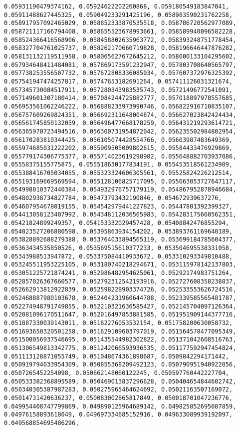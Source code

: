 \documentclass[11pt]{article}
\begin{document}
\begin{Verbatim}[commandchars=\\\{\}]
0.05931190479374162, 0.05924622202260868, 0.059180549183847041, 0.05911488627445325, 0.059049233291425196, 0.058983590231762258, 0.058917957092465029, 0.058852333870535518, 0.058786720562977089, 0.058721117166794408, 0.058655523678993661, 0.058589940096582228, 0.058524366416568906, 0.058458802635963772, 0.058393248751778454, 0.058327704761025737, 0.058262170660719828, 0.058196646447876282, 0.058131132119511958, 0.058065627672645212, 0.058000133104295602, 0.057934648411484081, 0.057869173591232947, 0.057803708640565797, 0.057738253556507732, 0.057672808336085034, 0.057607372976325392, 0.057541947474257817, 0.05747653182691264, 0.057411126031321674, 0.057345730084517911, 0.057280343983535743, 0.05721496772541091, 0.057149601307180414, 0.057084244725882777, 0.057018897978557685, 0.056953561062246222, 0.056888233973990746, 0.056822916710835107, 0.056757609269824351, 0.056692311648004874, 0.056627023842424434, 0.056561745850132059, 0.056496477668178259, 0.056431219293614721, 0.056365970723494516, 0.056300731954872042, 0.056235502984802954, 0.056170283810344425, 0.056105074428554766, 0.05603987483649369, 0.055974685031222202, 0.055909505009802615, 0.05584433476929869, 0.055779174306775377, 0.055714023619298982, 0.055648882703937086, 0.05558375155775875, 0.055518630177834191, 0.055453518561234989, 0.055388416705034055, 0.055323324606305561, 0.05525824226212514, 0.055193169669569594, 0.055128106825717095, 0.055063053727647117, 0.054998010372440384, 0.054932976757179119, 0.054867952878946684, 0.054802938734827784, 0.05473793432190846, 0.054672939637276, 0.054607954678019155, 0.054542979441227823, 0.05447801392399327, 0.054413058123407992, 0.054348112036565983, 0.054283175660562351, 0.05421824899249357, 0.054153332029457428, 0.05408842476855294, 0.054023527206880598, 0.05395863934154202, 0.053893761169640189, 0.053828892688279388, 0.053764033894565119, 0.053699184785604377, 0.05363434535850526, 0.053569515610377233, 0.053504695538331058, 0.05343988513947872, 0.053375084410933672, 0.053310293349810488, 0.053245511953225105, 0.053180740218294671, 0.053115978142137803, 0.053051225721874241, 0.052986482954625061, 0.05292174983751264, 0.052857026367660577, 0.052792312542193916, 0.052727608358238837, 0.052662913812922839, 0.052598228903374726, 0.052533553626724516, 0.052468887980103678, 0.052404231960644788, 0.052339585565481787, 0.052274948791749855, 0.052210321636585427, 0.052145704097126364, 0.052081096170511647, 0.052016497853881585, 0.051951909144377716, 0.051887330039143011, 0.05182276053532154, 0.051758200630058732, 0.051693650320501258, 0.051629109603797019, 0.051564578477095349, 0.051500056937546695, 0.051435544982302822, 0.051371042608516763, 0.051306549813342775, 0.051242066593936535, 0.051177592947454824, 0.051113128871055749, 0.051048674361898687, 0.0509842294171442, 0.050919794033954309, 0.050855368209492123, 0.050790951940922056, 0.0507265452254098, 0.050662148060122245, 0.050597760442227704, 0.050533382368895589, 0.050469013837296628, 0.050404654844602742, 0.050340305387987283, 0.050275965464624692, 0.05021163507169072, 0.05014731420636237, 0.050083002865817849, 0.050018701047236776, 0.049954408747799869, 0.049890125964689142, 0.049825852695087859, 0.04976158893618049, 0.049697334685152916, 0.049633089939192097, 0.049568854695486296, 
\end{Verbatim}
\end{document}
